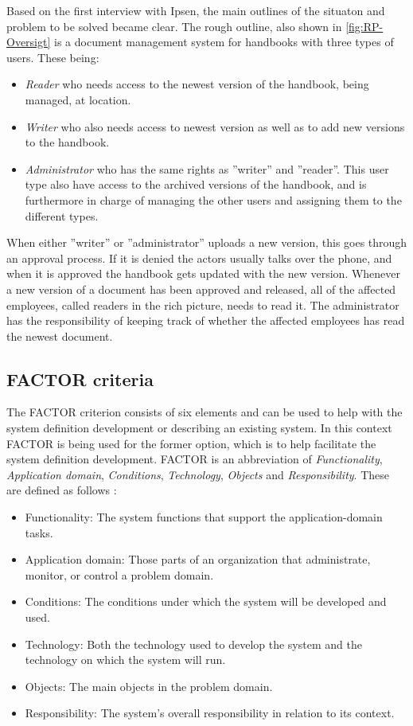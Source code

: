 Based on the first interview with Ipsen, the main outlines of the situaton and problem to be solved became clear.
The rough outline, also shown in \cref{fig:RP-Oversigt} is a document management system for handbooks with three types of users. These being:
\begin{itemize}
	\item
		\textit{Reader} who needs access to the newest version of the handbook, being managed, at location.
	\item
		\textit{Writer} who also needs access to newest version as well as to add new versions to the handbook.
	\item
		\textit{Administrator} who has the same rights as ''writer'' and ''reader''.
		This user type also have access to the archived versions of the handbook, and is furthermore in charge of managing the other users and assigning them to the different types.
\end{itemize}
When either ''writer'' or ''administrator'' uploads a new version, this goes through an approval process.
If it is denied the actors usually talks over the phone, and when it is approved the handbook gets updated with the new version.
Whenever a new version of a document has been approved and released, all of the affected employees, called readers in the rich picture, needs to read it.
The administrator has the responsibility of keeping track of whether the affected employees has read the newest document.


\subsection{FACTOR criteria} \label{sec:factorcriteria}
The FACTOR criterion consists of six elements and can be used to help with the system definition development or describing an existing system.
In this context FACTOR is being used for the former option, which is to help facilitate the system definition development.
FACTOR is an abbreviation of \textit{Functionality}, \textit{Application domain}, \textit{Conditions}, \textit{Technology}, \textit{Objects} and \textit{Responsibility}.
These are defined as follows \citep[p.~40]{Rod-Aalborg}:
\begin{itemize}
	\item
		Functionality:
		The system functions that support the application-domain tasks.
	\item
		Application domain:
		Those parts of an organization that administrate, monitor, or control a problem domain.
	\item
		Conditions:
		The conditions under which the system will be developed and used.
	\item
		Technology:
		Both the technology used to develop the system and the technology on which the system will run.
	\item
		Objects:
		The main objects in the problem domain.
	\item
		Responsibility:
		The system’s overall responsibility in relation to its context.
\end{itemize}

